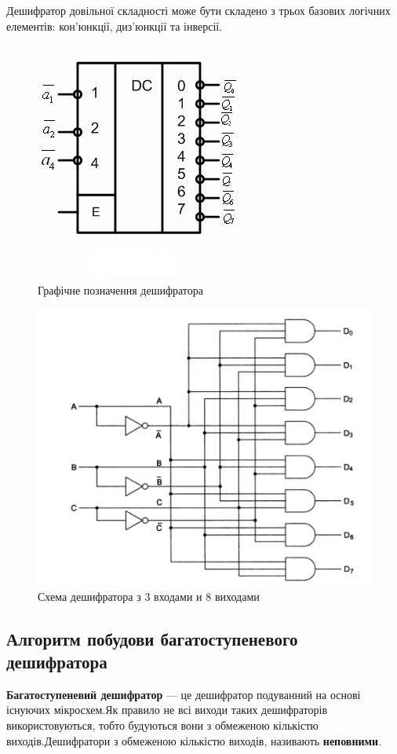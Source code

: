 Дешифратор довільної складності може бути складено з трьох базових логічних елементів: кон'юнкції, диз'юнкції та інверсії.
\begin{figure}[h!]
 \includegraphics{decoder.jpg}
 \centering
\caption{Графічне позначення дешифратора}\label{fig:decoder}
\end{figure}
\begin{figure}[h!]
 \includegraphics[scale=0.5]{decoder_scheme.png}
 \centering
\caption{Схема дешифратора з 3 входами и 8 виходами}\label{fig:decoder_scheme}
\end{figure}
\newpage
\subsection{Алгоритм побудови багатоступеневого дешифратора}
\textbf{Багатоступеневий дешифратор} — це дешифратор подуванний на основі існуючих мікросхем.Як правило не всі виходи таких дешифраторів використовуються, тобто будуються вони з обмеженою кількістю виходів.Дешифратори з обмеженою кількістю виходів, називають \textbf{неповними}.

